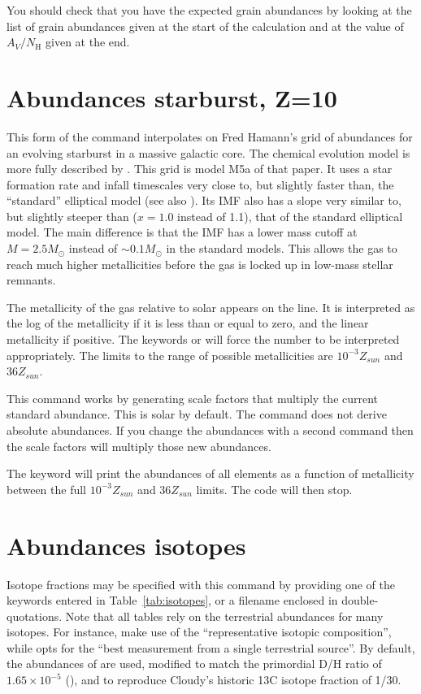 You should check that you have the expected grain abundances by looking
at the list of grain abundances given at the start of the calculation and
at the value of $A_V/N_{\mathrm{H}}$ given at the end.

\section{Abundances starburst, Z=10}

This form of the  command interpolates on
Fred Hamann's grid
of abundances for an evolving starburst in a massive galactic core.
The
chemical evolution model is more fully described by \citet{Hamann1993}.
This grid is model M5a of that paper.
It uses a star formation
rate and infall timescales very close to, but slightly faster than,
the
``standard'' elliptical model (see also \citealp{Arimoto1987,Matteucci1986,Matteucci1987,Bica1988}).
Its IMF also
has a slope very similar to, but slightly steeper than
($x = 1.0$ instead of 1.1), that of the standard elliptical model.
The main difference is
that the IMF has a lower mass cutoff at $M = 2.5 M_\odot$ instead of
$\sim 0.1 M_\odot$ in the standard models.
This allows the gas to reach much higher metallicities
before the gas is locked up in low-mass stellar remnants.

The metallicity of the gas relative to solar appears on the line.
It is interpreted as the log of the metallicity if it is
less than or equal
to zero, and the linear metallicity if positive.
The keywords
 or 
will force the number to be interpreted appropriately.
The limits to the
range of possible metallicities are $10^{-3} Z_{sun}$ and $36 Z_{sun}$.

This command works by generating scale factors that multiply
the current standard abundance.
This is solar by default.
The command does not derive
absolute abundances.
If you change the abundances with a second
command then the scale factors will multiply those new abundances.

The keyword  will print the abundances of
all elements as a function
of metallicity between the full $10^{-3} Z_{sun}$ and
$36 Z_{sun}$ limits.
The code will then stop.

\section{Abundances isotopes}

Isotope fractions may be specified with this command by providing
one of the keywords entered in Table~\ref{tab:isotopes}, or a
filename enclosed in double-quotations.
Note that all tables rely on the \citet{Rosman1998}
terrestrial abundances for many isotopes.
For instance, \citet{Asplund2009} make use of the
``representative isotopic composition'', while \citet{Lodders2003}
opts for the ``best measurement from a single terrestrial source''.
By default, the abundances of \citet{Asplund2009} are used,
modified to match the primordial D/H ratio of $1.65 \times 10^{-5}$
(\citealp{Pettini2001}), and to reproduce Cloudy's historic 13C isotope
fraction of 1/30.

